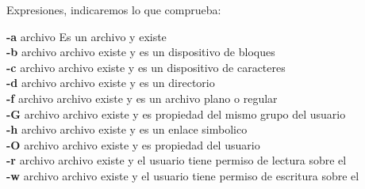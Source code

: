 \documentclass[11pt]{article}
\begin{document}
 Expresiones, indicaremos lo que comprueba:\\
 
\vspace{3mm}

\hspace{2cm} \textbf{-a} archivo \hspace{2cm}  Es un archivo y existe\\

\hspace{2cm} \textbf{-b} archivo \hspace{2cm} archivo existe y es un dispositivo de bloques \\

\hspace{2cm} \textbf{-c} archivo \hspace{2cm} archivo existe y es un dispositivo de caracteres \\

\hspace{2cm} \textbf{-d} archivo \hspace{2cm} archivo existe y es un directorio \\

\hspace{2cm} \textbf{-f} archivo \hspace{2cm} archivo existe y es un archivo plano o regular \\

\hspace{2cm} \textbf{-G} archivo \hspace{2cm} archivo existe y es propiedad del mismo grupo del usuario \\

\hspace{2cm} \textbf{-h} archivo \hspace{2cm} archivo existe y es un enlace simbolico \\

\hspace{2cm} \textbf{-O} archivo \hspace{2cm} archivo existe y es propiedad del usuario \\

\hspace{2cm} \textbf{-r} archivo \hspace{2cm} archivo existe y el usuario tiene permiso de lectura sobre el\\

\hspace{2cm} \textbf{-w} archivo \hspace{2cm} archivo existe y el usuario tiene permiso de escritura sobre el\\
\end{document}
